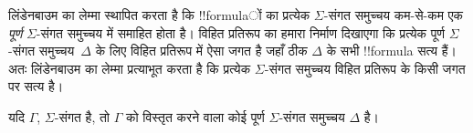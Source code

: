 \documentclass[../../../include/open-logic-section]{subfiles}
\begin{document}


लिंडेनबाउम का लेम्मा स्थापित करता है कि !!{formula}ों का प्रत्येक
$\Sigma$-संगत समुच्चय कम-से-कम एक \emph{पूर्ण} $\Sigma$-संगत समुच्चय में
समाहित होता है। विहित प्रतिरूप का हमारा निर्माण दिखाएगा कि प्रत्येक पूर्ण
$\Sigma$-संगत समुच्चय~$\Delta$ के लिए विहित प्रतिरूप में ऐसा जगत है जहाँ
ठीक $\Delta$ के सभी !!{formula} सत्य हैं। अतः लिंडेनबाउम का लेम्मा प्रत्याभूत
करता है कि प्रत्येक $\Sigma$-संगत समुच्चय विहित प्रतिरूप के किसी जगत पर
सत्य है।

\begin{thm}[लिंडेनबाउम का लेम्मा]
  यदि $\Gamma$, $\Sigma$-संगत है, तो $\Gamma$ को विस्तृत करने वाला कोई
  पूर्ण $\Sigma$-संगत समुच्चय $\Delta$ है।
\end{thm}
\end{document}
